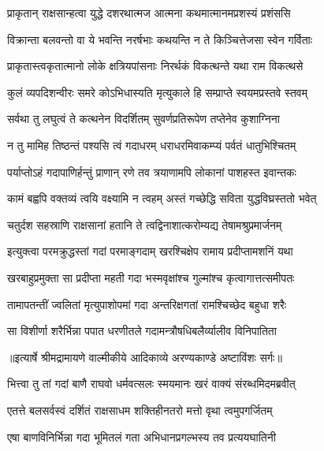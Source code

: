 \twolineshloka
{प्राकृतान् राक्षसान्हत्वा युद्धे दशरथात्मज}
{आत्मना कथमात्मानमप्रशस्यं प्रशंससि} %

\twolineshloka
{विक्रान्ता बलवन्तो वा ये भवन्ति नरर्षभाः}
{कथयन्ति न ते किञ्चित्तेजसा स्वेन गर्विताः} %

\twolineshloka
{प्राकृतास्त्वकृतात्मानो लोके क्षत्रियपांसनाः}
{निरर्थकं विकत्थन्ते यथा राम विकत्थसे} %

\twolineshloka
{कुलं व्यपदिशन्वीरः समरे कोऽभिधास्यति}
{मृत्युकाले हि सम्प्राप्ते स्वयमप्रस्तवे स्तवम्} %

\twolineshloka
{सर्वथा तु लघुत्वं ते कत्थनेन विदर्शितम्}
{सुवर्णप्रतिरूपेण तप्तेनेव कुशाग्निना} %

\twolineshloka
{न तु मामिह तिष्ठन्तं पश्यसि त्वं गदाधरम्}
{धराधरमिवाकम्प्यं पर्वतं धातुभिश्चितम्} %

\twolineshloka
{पर्याप्तोऽहं गदापाणिर्हन्तुं प्राणान् रणे तव}
{त्रयाणामपि लोकानां पाशहस्त इवान्तकः} %

\twolineshloka
{कामं बह्वपि वक्तव्यं त्वयि वक्ष्यामि न त्वहम्}
{अस्तं गच्छेद्धि सविता युद्धविघ्रस्ततो भवेत्} %

\twolineshloka
{चतुर्दश सहस्राणि राक्षसानां हतानि ते}
{त्वद्विनाशात्करोम्यद्य तेषामश्रुप्रमार्जनम्} %

\twolineshloka
{इत्युक्त्वा परमक्रुद्धस्तां गदां परमाङ्गदाम्}
{खरश्चिक्षेप रामाय प्रदीप्तामशनिं यथा} %

\twolineshloka
{खरबाहुप्रमुक्ता सा प्रदीप्ता महती गदा}
{भस्मवृक्षांश्च गुल्मांश्च कृत्वागात्तत्समीपतः} %

\twolineshloka
{तामापतन्तीं ज्वलितां मृत्युपाशोपमां गदा}
{अन्तरिक्षगतां रामश्चिच्छेद बहुधा शरैः} %

\twolineshloka
{सा विशीर्णा शरैर्भिन्ना पपात धरणीतले}
{गदामन्त्रौषधिबलैर्व्यालीव विनिपातिता} %


{॥इत्यार्षे श्रीमद्रामायणे वाल्मीकीये आदिकाव्ये अरण्यकाण्डे अष्टाविंशः सर्गः॥}


\twolineshloka
{भित्त्वा तु तां गदां बाणै राघवो धर्मवत्सलः}
{स्मयमानः खरं वाक्यं संरब्धमिदमब्रवीत्} %

\twolineshloka
{एतत्ते बलसर्वस्वं दर्शितं राक्षसाधम}
{शक्तिहीनतरो मत्तो वृथा त्वमुपगर्जितम्} %

\twolineshloka
{एषा बाणविनिर्भिन्ना गदा भूमितलं गता}
{अभिधानप्रगल्भस्य तव प्रत्ययघातिनी} %

